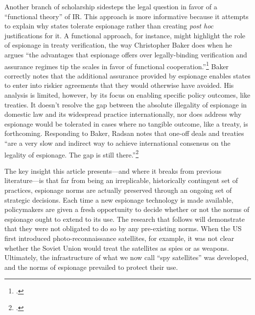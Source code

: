 \documentclass[12pt]{extarticle}
\begin{document}
Another branch of scholarship sidesteps the legal question in favor of a \enquote{functional theory} of IR. This approach is more informative because it attempts to explain why states tolerate espionage rather than creating \emph{post hoc} justifications for it. A functional approach, for instance, might highlight the role of espionage in treaty verification, the way Christopher Baker does when he argues \enquote{the advantages that espionage offers over legally-binding verification and assurance regimes tip the scales in favor of functional cooperation.}\footcite{baker_tolerance_2004} Baker correctly notes that the additional assurance provided by espionage enables states to enter into riskier agreements that they would otherwise have avoided. His analysis is limited, however, by its focus on enabling specific policy outcomes, like treaties. It doesn't resolve the gap between the absolute illegality of espionage in domestic law and its widespread practice internationally, nor does address why espionage would be tolerated in cases where no tangible outcome, like a treaty, is forthcoming. Responding to Baker, Radsan notes that one-off deals and treaties \enquote{are a very slow and indirect way to achieve international consensus on the legality of espionage. The gap is still there.}\footcite[607]{radsan_unresolved_2007}

The key insight this article presents---and where it breaks from previous literature---is that far from being an irreplicable, historically contingent set of practices, espionage norms are actually preserved through an ongoing set of strategic decisions. Each time a new espionage technology is made available, policymakers are given a fresh opportunity to decide whether or not the norms of espionage ought to extend to its use. The research that follows will demonstrate that they were not obligated to do so by any pre-existing norms. When the US first introduced photo-reconnaissance satellites, for example, it was not clear whether the Soviet Union would treat the satellites as spies or as weapons. Ultimately, the infrastructure of what we now call \enquote{spy satellites} was developed, and the norms of espionage prevailed to protect their use.




\end{document}
